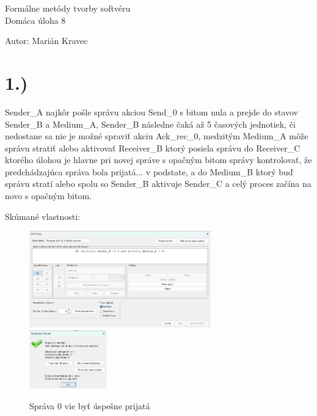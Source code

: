 \documentclass[a4paper]{article}
\begin{document}
 
	
\pagestyle{plain}

\begin{center}
	\sc\large
	Formálne metódy tvorby softvéru\\
	Domáca úloha 8
\end{center}

Autor: Marián Kravec


\section{1.)}

Sender\_A najkôr pošle správu akciou Send\_0 s bitom nula a prejde do stavov Sender\_B a Medium\_A, Sender\_B následne čaká až 5 časových jednotiek, či nedostane sa nie je možné spraviť akciu Ack\_rec\_0, medzitým Medium\_A môže správu stratiť alebo aktivovať Receiver\_B ktorý posiela správu do Receiver\_C ktorého úlohou je hlavne pri novej správe s opačným bitom správy kontrolovať, že predchádzajúca správa bola prijatá... v podstate, a do Medium\_B ktorý buď správu stratí alebo spolu so Sender\_B aktivuje Sender\_C a celý proces začína na novo s opačným bitom.

Skúmané vlastnosti:

\begin{figure}[!h]
	\centering
	\includegraphics[width=0.7\textwidth]{Q1.png}
	\includegraphics[width=0.3\textwidth]{R1.png}
	\caption{Správa 0 vie byť úspešne prijatá}
\end{figure}
\end{document}
